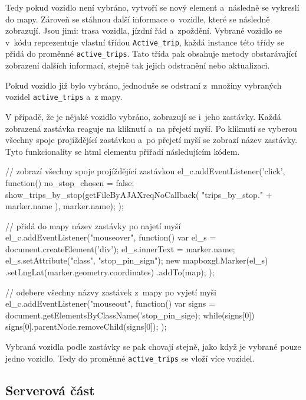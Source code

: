 \bigbreak


Tedy pokud vozidlo není vybráno, vytvoří se nový element a~následně se vykreslí do mapy. Zároveň se stáhnou další informace o~vozidle, které se následně zobrazují. Jsou jimi: trasa vozidla, jízdní řád a~zpoždění. Vybrané vozidlo se v~kódu reprezentuje vlastní třídou \verb-Active_trip-, každá instance této třídy se přidá do proměnné \verb-active_trips-. Tato třída pak obsahuje metody obstarávající zobrazení dalších informací, stejně tak jejich odstranění nebo aktualizaci.


\bigbreak


Pokud vozidlo již bylo vybráno, jednoduše se odstraní z~množiny vybraných vozidel \verb-active_trips- a~z mapy.


\bigbreak


V případě, že je nějaké vozidlo vybráno, zobrazují se i~jeho zastávky. Každá zobrazená zastávka reaguje na kliknutí a~na přejetí myší. Po kliknutí se vyberou všechny spoje projíždějící zastávkou a~po přejetí myší se zobrazí název zastávky. Tyto funkcionality se \gls{html} elementu přiřadí následujícím kódem.


\begin{code}[frame=none]
// zobrazí všechny spoje projíždějící zastávkou
el_c.addEventListener('click', function() {
  no_stop_chosen = false;
  show_trips_by_stop(getFileByAJAXreqNoCallback(
    "trips_by_stop." + marker.name
  ), marker.name);
});


// přidá do mapy název zastávky po najetí myší
el_c.addEventListener("mouseover", function(){
  var el_s = document.createElement('div');
  el_s.innerText = marker.name;
  el_s.setAttribute("class", "stop_pin_sign");
  new mapboxgl.Marker(el_s)
    .setLngLat(marker.geometry.coordinates)
    .addTo(map);
});


// odebere všechny názvy zastávek z~mapy po vyjetí myši
el_c.addEventListener("mouseout", function(){
  var signs = document.getElementsByClassName('stop_pin_sige);
  while(signs[0]) {
    signs[0].parentNode.removeChild(signs[0]);
  }
});
\end{code}


Vybraná vozidla podle zastávky se pak chovají stejně, jako když je vybrané pouze jedno vozidlo. Tedy do proměnné \verb-active_trips- se vloží více vozidel.


\subsection{Serverová část}

